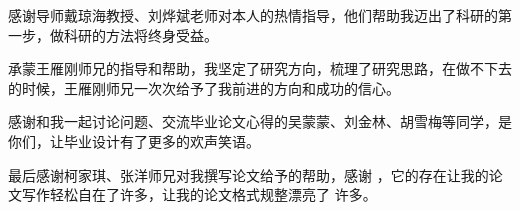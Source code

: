 
\begin{ack}
  感谢导师戴琼海教授、刘烨斌老师对本人的热情指导，他们帮助我迈出了科研的第一步，做科研的方法将终身受益。
  
  承蒙王雁刚师兄的指导和帮助，我坚定了研究方向，梳理了研究思路，在做不下去的时候，王雁刚师兄一次次给予了我前进的方向和成功的信心。
  
  感谢和我一起讨论问题、交流毕业论文心得的吴蒙蒙、刘金林、胡雪梅等同学，是你们，让毕业设计有了更多的欢声笑语。
  
  最后感谢柯家琪、张洋师兄对我撰写论文给予的帮助，感谢 \thuthesis，它的存在让我的论文写作轻松自在了许多，让我的论文格式规整漂亮了
  许多。
  
\end{ack}
